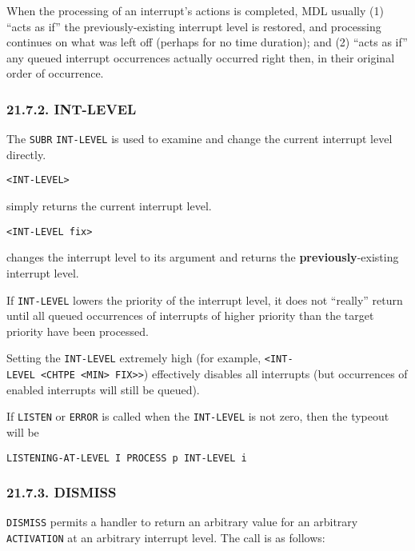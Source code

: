\documentclass[a4paper,]{article}
\begin{document}
When the processing of an interrupt's actions is completed, MDL usually (1) ``acts as if'' the previously-existing
interrupt level is restored, and processing continues on what was left off (perhaps for no time duration); and (2) ``acts
as if'' any queued interrupt occurrences actually occurred right then, in their original order of occurrence.

\subsubsection{21.7.2. INT-LEVEL}\label{int-level}

The \texttt{SUBR} \texttt{INT-LEVEL} is used to examine and change the current interrupt
level directly.

\begin{verbatim}
<INT-LEVEL>
\end{verbatim}

simply returns the current interrupt level.

\begin{verbatim}
<INT-LEVEL fix>
\end{verbatim}

changes the interrupt level to its argument and returns the \textbf{previously}-existing interrupt level.

If \texttt{INT-LEVEL} lowers the priority of the interrupt level, it does not ``really'' return until all queued
occurrences of interrupts of higher priority than the target priority have been processed.

Setting the \texttt{INT-LEVEL} extremely high (for example,
\texttt{\textless{}INT-LEVEL\ \textless{}CHTPE\ \textless{}MIN\textgreater{}\ FIX\textgreater{}\textgreater{}}) effectively
disables all interrupts (but occurrences of enabled interrupts will still be queued).

If \texttt{LISTEN} or \texttt{ERROR} is called when the \texttt{INT-LEVEL} is
not zero, then the typeout will be

\begin{verbatim}
LISTENING-AT-LEVEL I PROCESS p INT-LEVEL i
\end{verbatim}

\subsubsection{21.7.3. DISMISS}\label{dismiss}

\texttt{DISMISS} permits a handler to return an arbitrary value for an arbitrary
\texttt{ACTIVATION}  at an arbitrary interrupt level. The call is as follows:
\end{document}
